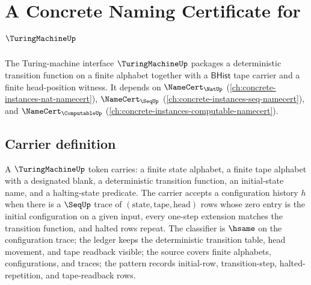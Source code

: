 \chapter{A Concrete Naming Certificate for $\TuringMachineUp$}
\label{ch:concrete-instances-turingmachine-namecert}

The Turing-machine interface $\TuringMachineUp$ packages a deterministic transition function on a finite alphabet together with a $\mathsf{BHist}$ tape carrier and a finite head-position witness. It depends on $\NameCert_{\NatUp}$ (\autoref{ch:concrete-instances-nat-namecert}), $\NameCert_{\SeqUp}$ (\autoref{ch:concrete-instances-seq-namecert}), and $\NameCert_{\ComputableUp}$ (\autoref{ch:concrete-instances-computable-namecert}).

\section{Carrier definition}
\label{sec:turingmachine-carrier}

A $\TuringMachineUp$ token carries: a finite state alphabet, a finite tape alphabet with a designated blank, a deterministic transition function, an initial-state name, and a halting-state predicate. The carrier accepts a configuration history $h$ when there is a $\SeqUp$ trace of $(\text{state}, \text{tape}, \text{head})$ rows whose zero entry is the initial configuration on a given input, every one-step extension matches the transition function, and halted rows repeat. The classifier is $\hsame$ on the configuration trace; the ledger keeps the deterministic transition table, head movement, and tape readback visible; the source covers finite alphabets, configurations, and traces; the pattern records initial-row, transition-step, halted-repetition, and tape-readback rows.

